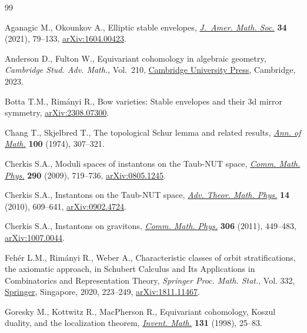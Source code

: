 \documentclass[pdftex]{sigma}
\numberwithin{equation}{section}
\begin{document}
\begin{thebibliography}{99}
\footnotesize\itemsep=0pt

Aganagic M., Okounkov A., Elliptic stable envelopes, \href{https://doi.org/10.1090/jams/954}{\textit{J.~Amer. Math.
 Soc.}} \textbf{34} (2021), 79--133, \href{https://arxiv.org/abs/1604.00423}{arXiv:1604.00423}.

Anderson D., Fulton W., Equivariant cohomology in algebraic geometry,
 \textit{Cambridge Stud. Adv. Math.}, Vol.~210, \href{https://doi.org/10.1017/9781009349994}{Cambridge University Press},
 Cambridge, 2023.

Botta T.M., Rim\'anyi R., Bow varieties: Stable envelopes and their 3d mirror
 symmetry, \href{https://arxiv.org/abs/2308.07300}{arXiv:2308.07300}.

Chang T., Skjelbred T., The topological {S}chur lemma and related results,
 \href{https://doi.org/10.2307/1971074}{\textit{Ann. of Math.}} \textbf{100} (1974), 307--321.

Cherkis S.A., Moduli spaces of instantons on the {T}aub-{NUT} space,
  \href{https://doi.org/10.1007/s00220-009-0863-8}{\textit{Comm. Math. Phys.}} \textbf{290} (2009), 719--736, \href{https://arxiv.org/abs/0805.1245}{arXiv:0805.1245}.

Cherkis S.A., Instantons on the {T}aub-{NUT} space, \href{https://doi.org/10.4310/atmp.2010.v14.n2.a7}{\textit{Adv. Theor. Math.
 Phys.}} \textbf{14} (2010), 609--641, \href{https://arxiv.org/abs/0902.4724}{arXiv:0902.4724}.

Cherkis S.A., Instantons on gravitons, \href{https://doi.org/10.1007/s00220-011-1293-y}{\textit{Comm. Math. Phys.}} \textbf{306}
 (2011), 449--483, \href{https://arxiv.org/abs/1007.0044}{arXiv:1007.0044}.

Feh\'er L.M., Rim\'anyi R., Weber A., Characteristic classes of orbit
 stratifications, the axiomatic approach, in Schubert {C}alculus and {I}ts
 {A}pplications in {C}ombinatorics and {R}epresentation {T}heory,
 \textit{Springer Proc. Math. Stat.}, Vol. 332, \href{https://doi.org/10.1007/978-981-15-7451-1}{Springer}, Singapore, 2020,
 223--249, \href{https://arxiv.org/abs/1811.11467}{arXiv:1811.11467}.

Goresky M., Kottwitz R., MacPherson R., Equivariant cohomology, {K}oszul
 duality, and the localization theorem, \href{https://doi.org/10.1007/s002220050197}{\textit{Invent. Math.}} \textbf{131}
 (1998), 25--83.


\end{thebibliography}
\end{document}
